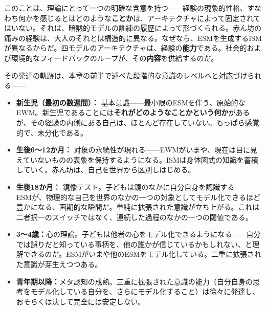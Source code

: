 \documentclass[11pt, twoside, openright]{book}
\begin{document}
このことは、理論にとって一つの明確な含意を持つ------経験の現象的性格、すなわち何かを感じるとはどのような\textbf{ことか}は、アーキテクチャによって固定されてはいない。それは、暗黙的モデルの訓練の履歴によって形づくられる。赤ん坊の痛みの経験は、大人のそれとは構造的に異なる。なぜなら、ESMを生成するISMが異なるからだ。四モデルのアーキテクチャは、経験の\textbf{能力}である。社会的および環境的なフィードバックのループが、その\textbf{内容}を供給するのだ。

その発達の軌跡は、本章の前半で述べた段階的な意識のレベルへと対応づけられる------

\begin{itemize}
  \item \textbf{新生児（最初の数週間）：} 基本意識------最小限のESMを伴う、原始的なEWM。新生児であることには\textbf{それがどのようなことかという何か}があるが、その経験の内側にある自己は、ほとんど存在していない。もっぱら感覚的で、未分化である。
\end{itemize}

\begin{itemize}
  \item \textbf{生後6〜12か月：} 対象の永続性が現れる------EWMがいまや、現在は目に見えていないものの表象を保持するようになる。ISMは身体図式の知識を蓄積していく。赤ん坊は、自己を世界から区別しはじめる。
\end{itemize}

\begin{itemize}
  \item \textbf{生後18か月：} 鏡像テスト。子どもは鏡のなかに自分自身を認識する------ESMが、物理的な自己を世界のなかの一つの対象としてモデル化できるほど豊かになる、画期的な瞬間だ。単純に拡張された意識が立ち上がる。これは二者択一のスイッチではなく、連続した過程のなかの一つの閾値である。
\end{itemize}

\begin{itemize}
  \item \textbf{3〜4歳：}心の理論。子どもは他者の心をモデル化できるようになる------自分では誤りだと知っている事柄を、他の誰かが信じているかもしれない、と理解できるのだ。ESMがいまや他のESMをモデル化している。二重に拡張された意識が芽生えつつある。
\end{itemize}

\begin{itemize}
  \item \textbf{青年期以降：}メタ認知の成熟。三重に拡張された意識の能力（自分自身の思考をモデル化している自分を、さらにモデル化すること）は徐々に発達し、おそらくは決して完全には安定しない。
\end{itemize}
\end{document}
